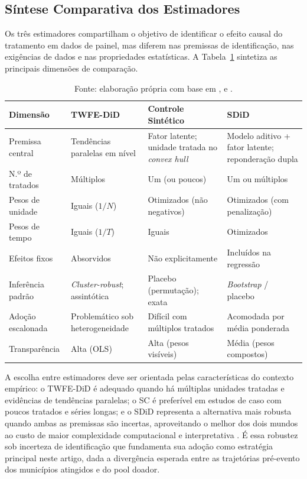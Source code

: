 \documentclass[a4paper,12pt]{article}
\begin{document}
\subsection{Síntese Comparativa dos Estimadores}

Os três estimadores compartilham o objetivo de identificar o efeito causal do tratamento
em dados de painel, mas diferem nas premissas de identificação, nas exigências de dados e
nas propriedades estatísticas. A Tabela~\ref{tab:comparacao} sintetiza as principais
dimensões de comparação.

\begin{table}[htbp]
\centering
\caption{Comparação entre os Estimadores TWFE-DiD, SC e SDiD}
\label{tab:comparacao}
\footnotesize
\begin{tabular}{p{2.5cm} p{3.2cm} p{3.2cm} p{3.2cm}}
\toprule
\textbf{Dimensão} & \textbf{TWFE-DiD} & \textbf{Controle Sintético} & \textbf{SDiD} \\
\midrule
Premissa central & Tendências paralelas em nível &
  Fator latente; unidade tratada no \textit{convex hull} &
  Modelo aditivo + fator latente; reponderação dupla \\[4pt]
N.º de tratados & Múltiplos & Um (ou poucos) & Um ou múltiplos \\[4pt]
Pesos de unidade & Iguais ($1/N$) & Otimizados (não negativos) &
  Otimizados (com penalização) \\[4pt]
Pesos de tempo & Iguais ($1/T$) & Iguais & Otimizados \\[4pt]
Efeitos fixos & Absorvidos & Não explicitamente & Incluídos na regressão \\[4pt]
Inferência padrão & \textit{Cluster-robust}; assintótica &
  Placebo (permutação); exata & \textit{Bootstrap} / placebo \\[4pt]
Adoção escalonada & Problemático sob heterogeneidade &
  Difícil com múltiplos tratados & Acomodada por média ponderada \\[4pt]
Transparência & Alta (OLS) & Alta (pesos visíveis) & Média (pesos compostos) \\
\bottomrule
\end{tabular}
\caption*{\footnotesize Fonte: elaboração própria com base em ,
 e .}
\end{table}

A escolha entre estimadores deve ser orientada pelas características do contexto empírico:
o TWFE-DiD é adequado quando há múltiplas unidades tratadas e evidências de tendências
paralelas; o SC é preferível em estudos de caso com poucos tratados e séries longas; e o
SDiD representa a alternativa mais robusta quando ambas as premissas são incertas,
aproveitando o melhor dos dois mundos ao custo de maior complexidade computacional e
interpretativa \cite{arkhangelsky2021}. É essa robustez sob incerteza de identificação que
fundamenta sua adoção como estratégia principal neste artigo, dada a divergência esperada
entre as trajetórias pré-evento dos municípios atingidos e do pool doador.
\end{document}
